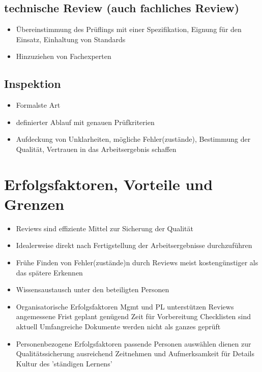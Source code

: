 \documentclass{report}
\theoremstyle{definition}
\theoremstyle{example}
\begin{document}
\subsection{technische Review (auch fachliches Review)}
\begin{itemize}
   \item Übereinstimmung des Prüflings mit einer Spezifikation, Eignung für den Einsatz, Einhaltung von Standards
   \item Hinzuziehen von Fachexperten
\end{itemize}

\subsection{Inspektion}
\begin{itemize}
   \item Formalste Art
   \item definierter Ablauf mit genauen Prüfkriterien
   \item Aufdeckung von Unklarheiten, mögliche Fehler(zustände), Bestimmung der Qualität, Vertrauen in das Arbeitsergebnis schaffen
\end{itemize}


\section{Erfolgsfaktoren, Vorteile und Grenzen}
\begin{itemize}
   \item Reviews sind effiziente Mittel zur Sicherung der Qualität
   \item Idealerweise direkt nach Fertigstellung der Arbeitsergebnisse durchzuführen
   \item Frühe Finden von Fehler(zustände)n durch Reviews meist kostengünstiger als das spätere Erkennen
   \item Wissensaustausch unter den beteiligten Personen
   \item Organisatorische Erfolgsfaktoren
   \subitem Mgmt und PL unterstützen Reviews
   \subitem angemessene Frist geplant
   \subitem genügend Zeit für Vorbereitung
   \subitem Checklisten sind aktuell
   \subitem Umfangreiche Dokumente werden nicht als ganzes geprüft
   \item Personenbezogene Erfolgsfaktoren
   \subitem passende Personen auswählen
   \subitem dienen zur Qualitätssicherung
   \subitem ausreichend Zeitnehmen und Aufmerksamkeit für Details
   \subitem Kultur des 'ständigen Lernens'
\end{itemize}
\end{document}
